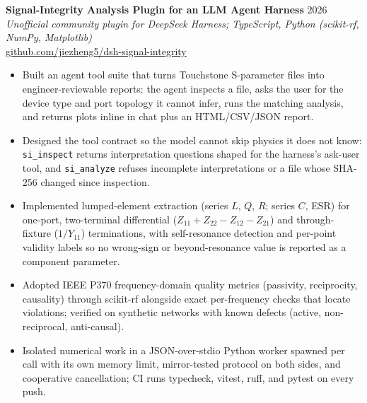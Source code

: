 
\textbf{Signal-Integrity Analysis Plugin for an LLM Agent Harness} \hfill 2026 \\
\emph{Unofficial community plugin for DeepSeek Harness; TypeScript, Python (scikit-rf, NumPy, Matplotlib)} \\
\href{https://github.com/jiezheng5/dsh-signal-integrity}{github.com/jiezheng5/dsh-signal-integrity}
\begin{itemize}
  \item Built an agent tool suite that turns Touchstone S-parameter files into
        engineer-reviewable reports: the agent inspects a file, asks the user for
        the device type and port topology it cannot infer, runs the matching
        analysis, and returns plots inline in chat plus an HTML/CSV/JSON report.
  \item Designed the tool contract so the model cannot skip physics it does not
        know: \texttt{si\_inspect} returns interpretation questions shaped for
        the harness's ask-user tool, and \texttt{si\_analyze} refuses incomplete
        interpretations or a file whose SHA-256 changed since inspection.
  \item Implemented lumped-element extraction (series $L$, $Q$, $R$; series
        $C$, ESR) for one-port, two-terminal differential
        ($Z_{11}{+}Z_{22}{-}Z_{12}{-}Z_{21}$) and through-fixture ($1/Y_{11}$)
        terminations, with self-resonance detection and per-point validity
        labels so no wrong-sign or beyond-resonance value is reported as a
        component parameter.
  \item Adopted IEEE P370 frequency-domain quality metrics (passivity,
        reciprocity, causality) through scikit-rf alongside exact per-frequency
        checks that locate violations; verified on synthetic networks with known
        defects (active, non-reciprocal, anti-causal).
  \item Isolated numerical work in a JSON-over-stdio Python worker spawned per
        call with its own memory limit, mirror-tested protocol on both sides,
        and cooperative cancellation; CI runs typecheck, vitest, ruff, and pytest
        on every push.
\end{itemize}

